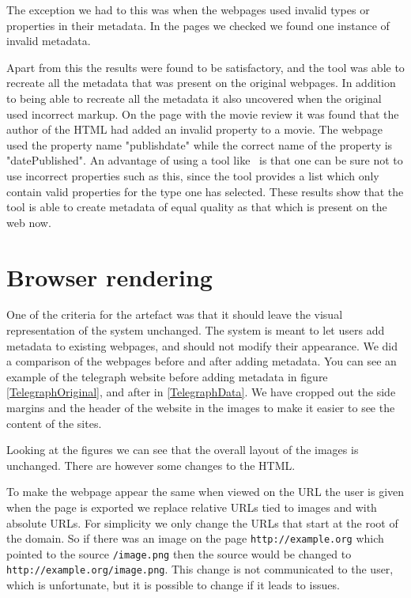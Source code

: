 The exception we had to this was when the webpages used invalid types or properties in their metadata.
In the pages we checked we found one instance of invalid metadata.

Apart from this the results were found to be satisfactory,
and the tool was able to recreate all the metadata that was present on the original webpages.
In addition to being able to recreate all the metadata it also uncovered when the original used incorrect markup.
On the page with the movie review it was found that the author of the HTML had added an invalid property to a movie.
The webpage used the property name "publishdate" while the correct name of the property is "datePublished".
An advantage of using a tool like \theartefact\ is that one can be sure not to use incorrect properties such as this,
since the tool provides a list which only contain valid properties for the type one has selected.
These results show that the tool is able to create metadata of equal quality as that which is present on the web now.

\section{Browser rendering}
\label{Rendering}
One of the criteria for the artefact was that it should leave the visual representation of the system unchanged.
The system is meant to let users add metadata to existing webpages, and should not modify their appearance.
We did a comparison of the webpages before and after adding metadata.
You can see an example of the telegraph website before adding metadata in figure \ref{TelegraphOriginal},
and after in \ref{TelegraphData}.
We have cropped out the side margins and the header of the website in the images to make it easier to see the content of the sites.


Looking at the figures we can see that the overall layout of the images is unchanged.
There are however some changes to the HTML.

To make the webpage appear the same when viewed on the URL the user is given when the page is exported
we replace relative URLs tied to images and  with absolute URLs.
For simplicity we only change the URLs that start at the root of the domain.
So if there was an image on the page \texttt{http://example.org} which pointed to the source \texttt{/image.png}
then the source would be changed to \texttt{http://example.org/image.png}.
This change is not communicated to the user, which is unfortunate,
but it is possible to change if it leads to issues.


